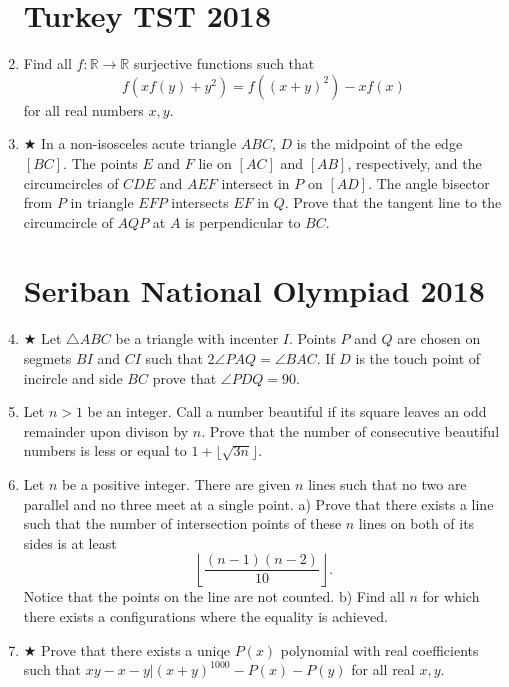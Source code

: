 \documentclass[12pt]{article}
\begin{document}
\begin{enumerate}
		\section*{Turkey TST 2018}
		
		\item Find all $f:\mathbb{R}\to\mathbb{R}$ surjective functions such that
		$$f(xf(y)+y^2)=f((x+y)^2)-xf(x) $$for all real numbers $x,y$.
		
		\item $ \bigstar $ In a non-isosceles acute triangle $ABC$, $D$ is the midpoint of the edge $[BC]$. The points $E$ and $F$ lie on $[AC]$ and $[AB]$, respectively, and the circumcircles of $CDE$ and $AEF$ intersect in $P$ on $[AD]$. The angle bisector from $P$ in triangle $EFP$ intersects $EF$ in $Q$. Prove that the tangent line to the circumcircle of $AQP$ at $A$ is perpendicular to $BC$. 
		
		
	
		
		\section*{Seriban National Olympiad 2018}
		
		\item $ \bigstar $ Let $\triangle ABC$ be a triangle with incenter $I$. Points $P$ and $Q$ are chosen on segmets $BI$ and $CI$ such that $2\angle  PAQ=\angle BAC$. If $D$ is the touch point of incircle and side $BC$ prove that $\angle PDQ=90$.
		
		\item Let $n>1$ be an integer. Call a number beautiful if its square leaves an odd remainder upon divison by $n$. Prove that the number of consecutive beautiful numbers is less or equal to $1+\lfloor \sqrt{3n} \rfloor$.
		
		\item Let $n$ be a positive integer. There are given $n$ lines such that no two are parallel and no three meet at a single point.
		a) Prove that there exists a line such that the number of intersection points of these $n$ lines on both of its sides is at least
		$$\left \lfloor \frac{(n-1)(n-2)}{10} \right \rfloor.$$Notice that the points on the line are not counted.
		b) Find all $n$ for which there exists a configurations where the equality is achieved.
		
		\item $ \bigstar $ Prove that there exists a uniqe $P(x)$ polynomial with real coefficients such that
		$xy-x-y|(x+y)^{1000}-P(x)-P(y)$ for all real $x,y$.
		

\end{enumerate}
\end{document}

